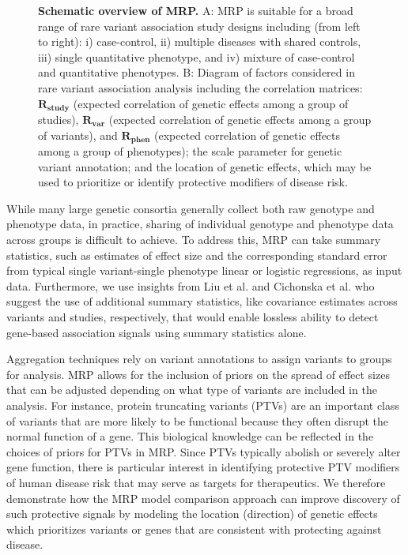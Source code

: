 \begin{figure}[!h]
\caption{{\bf Schematic overview of MRP.}
A: MRP is suitable for a broad range of rare variant association study designs including (from left to right): i) case-control, ii) multiple diseases with shared controls, iii) single quantitative phenotype, and iv) mixture of case-control and quantitative phenotypes. B: Diagram of factors considered in rare variant association analysis including the correlation matrices: $\mathbf{R_{\textrm{study}}}$  (expected correlation of genetic effects among a group of studies), $\mathbf{R_{\textrm{var}}}$ (expected correlation of genetic effects among a group of variants), and $\mathbf{R_{\textrm{phen}}}$ (expected correlation of genetic effects among a group of phenotypes); the scale parameter for genetic variant annotation; and the location of genetic effects, which may be used to prioritize or identify protective modifiers of disease risk.}
\label{overview}
\end{figure}

While many large genetic consortia generally collect both raw genotype and phenotype data, in practice, sharing of individual genotype and phenotype data across groups is difficult to achieve. To address this, MRP can take summary statistics, such as estimates of effect size and the corresponding standard error from typical single variant-single phenotype linear or logistic regressions, as input data. Furthermore, we use insights from Liu et al.\cite{liu2014meta} and Cichonska et al.\cite{cichonska2016metacca} who suggest the use of additional summary statistics, like covariance estimates across variants and studies, respectively, that would enable lossless ability to detect gene-based association signals using summary statistics alone.  

Aggregation techniques rely on variant annotations to assign variants to groups for analysis. MRP allows for the inclusion of priors on the spread of effect sizes that can be adjusted depending on what type of variants are included in the analysis. For instance, protein truncating variants (PTVs)\cite{rivas2013assessing,rivas2015effect} are an important class of variants that are more likely to be functional because they often disrupt the normal function of a gene. This biological knowledge can be reflected in the choices of priors for PTVs in MRP. Since PTVs typically abolish or severely alter gene function, there is particular interest in identifying protective PTV modifiers of human disease risk that may serve as targets for therapeutics\cite{pcsk9,cohen2006sequence,sullivan2012effect}. We therefore demonstrate how the MRP model comparison approach can improve discovery of such protective signals by modeling the location (direction) of genetic effects which prioritizes variants or genes that are consistent with protecting against disease. 


